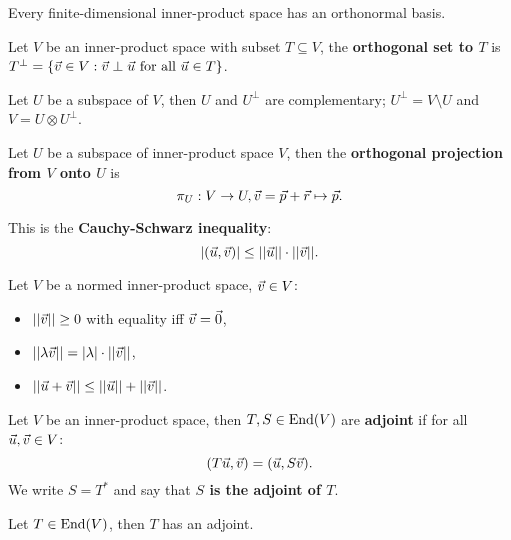 \begin{multicols}{2}
\begin{theorem}[5.1.10]
Every finite-dimensional inner-product space has an orthonormal basis.
\end{theorem}

\begin{definition}
Let $V$ be an inner-product space with subset $T\subseteq V$, the \textbf{orthogonal set to $T$} is $T^\perp =\{\vec{v}\in V: \vec{v}\perp\vec{u}\text{ for all }\vec{u}\in T\}$.
\end{definition}

\begin{theorem}[5.2.2]
Let $U$ be a subspace of $V$, then $U$ and $U^\perp$ are complementary; $U^\perp = V\setminus U$ and $V=U\otimes U^\perp$.
\end{theorem}

\begin{definition}
Let $U$ be a subspace of inner-product space $V$, then the \textbf{orthogonal projection from $V$ onto $U$} is
    \[
    \pi_U:V\to U, \vec{v}=\vec{p}+\vec{r}\mapsto \vec{p}.
    \]
\end{definition}

\begin{theorem}[5.2.5]
This is the \textbf{Cauchy-Schwarz inequality}:
    \[
    |(\vec{u},\vec{v})| \leq ||\vec{u}||\cdot ||\vec{v}||.
    \]
\end{theorem}

\begin{theorem}[5.2.6] Let $V$ be a normed inner-product space, $\vec{v}\in V$:
    \begin{itemize}
        \item $||\vec{v}||\geq0$ with equality iff $\vec{v}=\vec{0}$,
        \item $||\lambda\vec{v}||=|\lambda|\cdot||\vec{v}||$,
        \item $||\vec{u}+\vec{v}||\leq ||\vec{u}||+||\vec{v}||$.
    \end{itemize}
\end{theorem}


\begin{definition}
Let $V$ be an inner-product space, then $T,S\in\mathrm{End}(V)$ are \textbf{adjoint} if for all $\vec{u},\vec{v}\in V$:
    \[
    (T\vec{u},\vec{v}) = (\vec{u},S\vec{v}).
    \]
We write $S=T^*$ and say that \textbf{$S$ is the adjoint of $T$}.
\end{definition}

\begin{theorem}[5.3.4]
Let $T\in\mathrm{End}(V)$, then $T$ has an adjoint.
\end{theorem}


\end{multicols}

